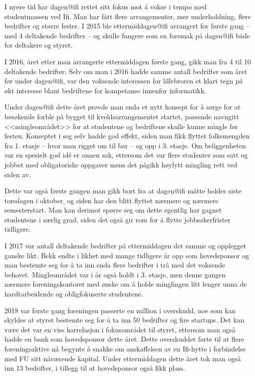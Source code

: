 \author{Skrevet av Karl H. Totland}

I nyere tid har dagen@ifi rettet sitt fokus mot å vokse i tempo med studentmassen ved Ifi. Man har fått flere arrangementer, mer underholdning, flere bedrifter og større fester. I 2015 ble ettermiddagen@ifi arrangert for første gang -- med 4 deltakende bedrifter -- og skulle fungere som en forsmak på dagen@ifi både for deltakere og styret.

I 2016, året etter man arrangerte ettermiddagen første gang, gikk man fra 4 til 10 deltakende bedrifter. Selv om man i 2016 hadde samme antall bedrifter som året før under dagen@ifi, var den voksende interessen for lillebroren et klart tegn på økt interesse blant bedriftene for kompetanse innenfor informatikk.

Under dagen@ifi dette året prøvde man enda et nytt konsept for å sørge for at besøkende forble på bygget til kveldsarrangementet startet, passende navngitt <<mingleområdet>> for at studentene og bedriftene skulle kunne mingle før festen. Konseptet i seg selv hadde god effekt, siden man fikk flyttet folkemengden fra 1. etasje -- hvor man rigget om til bar -- og opp i 3. etasje. Om beliggenheten var en spesielt god idé er annen sak, ettersom det var flere studenter som satt og jobbet med obligatoriske oppgaver mens det pågikk høylytt mingling rett ved siden av.

Dette var også første gangen man gikk bort fra at dagen@ifi måtte holdes siste torsdagen i oktober, og siden har den blitt flyttet nærmere og nærmere semesterstart. Man kan derimot spørre seg om dette egentlig har gagnet studentene i særlig grad, siden det også gir rom for å flytte jobbsøkerfrister tidligere.

I 2017 var antall deltakende bedrifter på ettermiddagen det samme og opplegget ganske likt. Bekk endte i likhet med mange tidligere år opp som hovedsponsor og man bestemte seg for å ta inn enda flere bedrifter i trå med det voksende behovet. Mingleområdet var i år også holdt i 3. etasje, men denne gangen nærmere foreningskontoret med ønske om å holde minglingen litt lenger unna de hardtarbeidende og obligfokuserte studentene.

2018 var første gang foreningen passerte en million i overskudd, noe som kan skyldes at styret bestemte seg for å ta inn 50 bedrifter og fire startups. Det kan være det var en viss korrelasjon i fokusområdet til styret, ettersom man også hadde en bank som hovedsponsor dette året. Dette overskuddet førte til at flere foreningsaktive nå begynte å snakke om anskaffelsen av en Ifi-hytte i forbindelse med FU sitt nåværende kapital. Under ettermiddagen dette året tok man også inn 13 bedrifter, i tillegg til at hovedsponsor også fikk plass.

